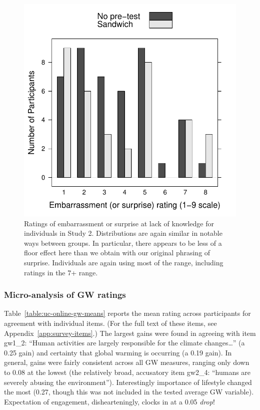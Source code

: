 \begin{figure}
    \centering
    \includegraphics{RPP-mech-embarrass-by-group.pdf}
    \caption{Ratings of embarrassment or surprise at lack of knowledge for
        individuals in Study 2. Distributions are again similar in notable ways
        between groups. In particular, there appears to be less of a floor
        effect here than
        we obtain with our original phrasing of surprise. Individuals are again
    using most of the range, including ratings in the 7+ range.}
    \label{fig:rpp-mech-embarrass}
\end{figure}

\subsubsection{Micro-analysis of GW ratings}

Table~\ref{table:uc-online-gw-means} reports the mean rating across participants
for agreement with individual items. (For the full text of these items, see
Appendix~\ref{app:survey-items}.) The largest gains were found in agreeing with
item \textsf{gw1_2}: ``Human activities are largely responsible for the climate
changes\ldots'' (a 0.25 gain) and certainty that global warming is occurring (a
0.19 gain).  In general, gains were fairly consistent across all GW measures,
ranging only down to 0.08 at the lowest (the relatively broad, accusatory item
\textsf{gw2_4}: “humans are severely abusing the environment”). Interestingly
importance of lifestyle changed the most (0.27, though this was not included in
the tested average GW variable).  Expectation of engagement, dishearteningly,
clocks in at a 0.05 \emph{drop}! 

